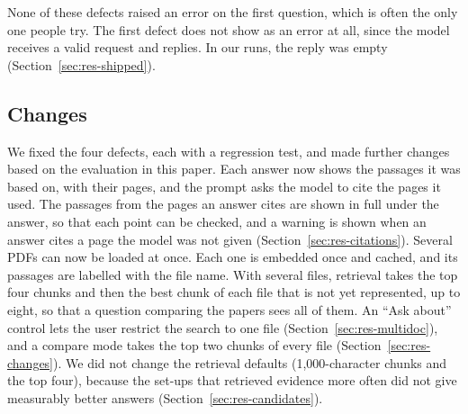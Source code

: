 None of these defects raised an error on the first question, which is often the only one people
try. The first defect does not show as an error at all, since the model receives a valid request
and replies. In our runs, the reply was empty (Section~\ref{sec:res-shipped}).

\subsection{Changes}
\label{sec:changes}

We fixed the four defects, each with a regression test, and made further changes based on the
evaluation in this paper. Each answer now shows the passages it was based on, with their pages,
and the prompt asks the model to cite the pages it used. The passages from the pages an answer
cites are shown in full under the answer, so that each point can be checked, and a warning is
shown when an answer cites a page the model was not given (Section~\ref{sec:res-citations}).
Several PDFs can now be loaded at once. Each one is embedded once and cached, and its passages
are labelled with the file name. With several files, retrieval takes the top four chunks and
then the best chunk of each file that is not yet represented, up to eight, so that a question
comparing the papers sees all of them. An ``Ask about'' control lets the user restrict the search
to one file (Section~\ref{sec:res-multidoc}), and a compare mode takes the top two chunks of every
file (Section~\ref{sec:res-changes}). We did not change the retrieval defaults (1,000-character
chunks and the top four), because the set-ups that retrieved evidence more often did not give
measurably better answers (Section~\ref{sec:res-candidates}).
